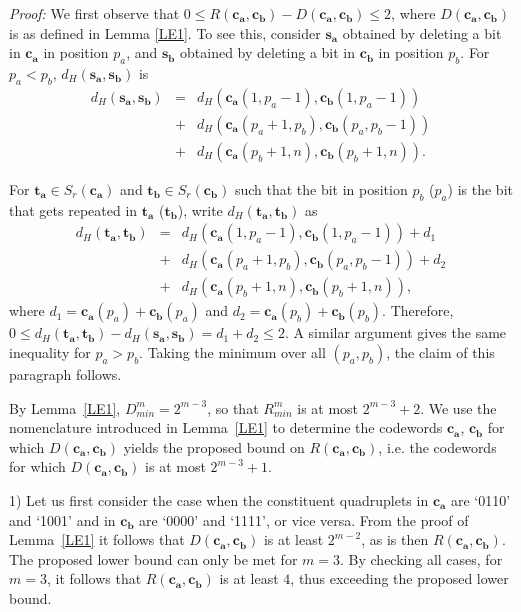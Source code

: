 \noindent \textit{Proof:} We first observe that $0 \leq
R(\mathbf{c_a},\mathbf{c_b})-D(\mathbf{c_a},\mathbf{c_b}) \leq 2$,
where $D(\mathbf{c_a},\mathbf{c_b})$ is as defined in Lemma
\ref{LE1}.  To see this, consider $\mathbf{s_a}$ obtained by
deleting a bit in $\mathbf{c_a}$ in position $p_a$, and
$\mathbf{s_b}$ obtained by deleting a bit in $\mathbf{c_b}$ in
position $p_b$. For $p_a<p_b$, $d_H(\mathbf{s_a},\mathbf{s_b})$ is
\begin{eqnarray*}d_H(\mathbf{s_a},\mathbf{s_b}) &=&
d_H(\mathbf{c_a}(1,p_a-1),\mathbf{c_b}(1,p_a-1))\\
{}&+&d_H(\mathbf{c_a}(p_a+1,p_b),\mathbf{c_b}(p_a,p_b-1))\\
{}&+&d_H(\mathbf{c_a}(p_b+1,n),\mathbf{c_b}(p_b+1,n)).\end{eqnarray*}

For $\mathbf{t_a} \in S_r(\mathbf{c_a})$ and $\mathbf{t_b} \in
S_r(\mathbf{c_b})$ such that the bit in position $p_b$ ($p_a$) is
the bit that gets repeated in $\mathbf{t_a}$ ($\mathbf{t_b}$),
write $d_H(\mathbf{t_a},\mathbf{t_b})$ as
\begin{eqnarray*}
d_H(\mathbf{t_a},\mathbf{t_b})&=&d_H(\mathbf{c_a}(1,p_a-1),\mathbf{c_b}(1,p_a-1))
+d_1\\
{}&+&d_H(\mathbf{c_a}(p_a+1,p_b),\mathbf{c_b}(p_a,p_b-1)) +d_2\\
{}&+&d_H(\mathbf{c_a}(p_b+1,n),\mathbf{c_b}(p_b+1,n)),
\end{eqnarray*}
where $d_1=\mathbf{c_a}(p_a)+\mathbf{c_b}(p_a)$ and
$d_2=\mathbf{c_a}(p_b)+\mathbf{c_b}(p_b)$. Therefore, $0 \le
d_H(\mathbf{t_a},\mathbf{t_b})- d_H(\mathbf{s_a},\mathbf{s_b}) =
d_1+d_2 \leq 2$. A similar argument gives the same inequality for
$p_a > p_b$. Taking the minimum over all $(p_a, p_b)$, the claim
of this paragraph follows.


By Lemma~\ref{LE1}, $D_{min}^m=2^{m-3}$, so that $R_{min}^m$ is at
most $2^{m-3}+2$. We use the nomenclature introduced in
Lemma~\ref{LE1} to determine the codewords $\mathbf{c_a}$,
$\mathbf{c_b}$ for which $D(\mathbf{c_a},\mathbf{c_b})$ yields the
proposed bound on $R(\mathbf{c_a},\mathbf{c_b})$, i.e. the
codewords for which $D(\mathbf{c_a},\mathbf{c_b})$ is at most
$2^{m-3}+1$.


1) Let us first consider the case when the constituent quadruplets
in $\mathbf{c_a}$ are `0110' and `1001' and in $\mathbf{c_b}$ are
`0000' and `1111', or vice versa. From the proof of
Lemma~\ref{LE1} it follows that $D(\mathbf{c_a},\mathbf{c_b})$ is
at least $2^{m-2}$, as is then $R(\mathbf{c_a},\mathbf{c_b})$. The
proposed lower bound can only be met for $m = 3$. By checking all
cases, for $m = 3$, it follows that $R(\mathbf{c_a},\mathbf{c_b})$
is at least $4$, thus exceeding the proposed lower bound.

